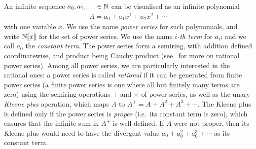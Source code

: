 An infinite sequence $a_0,a_1,\ldots \in \mathbb N$ can be visualised as an infinite polynomial
\begin{align*}
 A = a_0 + a_1x^1 + a_2x^2 + \cdots
\end{align*}
with one variable $x$.
We use the name \emph{power series} for such polynomials, and write $\mathbb N [\![x]\!]$ for the set of power series. 
We use the name \emph{$i$-th term} for $a_i$; and we call $a_0$ the \emph{constant term}.   The power series form a semiring, with addition defined coordinatewise, and product being Cauchy product (see~\cite[part III]{sakarovitch2009elements} for more on rational power series). Among all power series, we are particularly interested in the rational ones: a power series is called \emph{rational} if it can be generated from finite power series (a finite power series is one where all but finitely many terms are zero) using the semiring operations $+$ and $\times$ of power series, as well as the  unary  \emph{Kleene plus} operation, which maps $A$ to $A^+ = A + A^2 + A^3 + \cdots$.
The Kleene plus is defined only if the power series is  \emph{proper} (i.e.~its constant term is zero), which ensures that the infinite sum in $A^+$ is well defined. If $A$ were not proper, then its Kleene plus would need to have the divergent value $a_0 + a_0^2 + a_0^3 + \cdots$ as its constant term.

